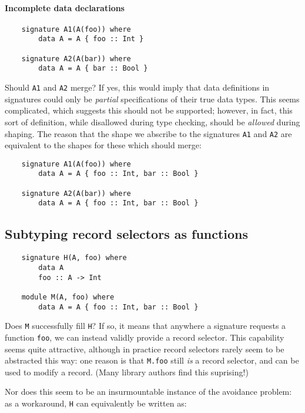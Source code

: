 \documentclass{article}
\begin{document}
\paragraph{Incomplete data declarations}

\begin{verbatim}
    signature A1(A(foo)) where
        data A = A { foo :: Int }

    signature A2(A(bar)) where
        data A = A { bar :: Bool }
\end{verbatim}
%
Should \verb|A1| and \verb|A2| merge?  If yes, this would imply
that data definitions in signatures could only be \emph{partial}
specifications of their true data types.  This seems complicated,
which suggests this should not be supported; however, in fact,
this sort of definition, while disallowed during type checking,
should be \emph{allowed} during shaping. The reason that the
shape we abscribe to the signatures \verb|A1| and \verb|A2| are
equivalent to the shapes for these which should merge:

\begin{verbatim}
    signature A1(A(foo)) where
        data A = A { foo :: Int, bar :: Bool }

    signature A2(A(bar)) where
        data A = A { foo :: Int, bar :: Bool }
\end{verbatim}

\subsection{Subtyping record selectors as functions}

\begin{verbatim}
    signature H(A, foo) where
        data A
        foo :: A -> Int

    module M(A, foo) where
        data A = A { foo :: Int, bar :: Bool }
\end{verbatim}
%
Does \verb|M| successfully fill \verb|H|?  If so, it means that anywhere
a signature requests a function \verb|foo|, we can instead validly
provide a record selector.  This capability seems quite attractive,
although in practice record selectors rarely seem to be abstracted this
way: one reason is that \verb|M.foo| still \emph{is} a record selector,
and can be used to modify a record.  (Many library authors find this
suprising!)

Nor does this seem to be an insurmountable instance of the avoidance
problem:
as a workaround, \verb|H| can equivalently be written as:
\end{document}
